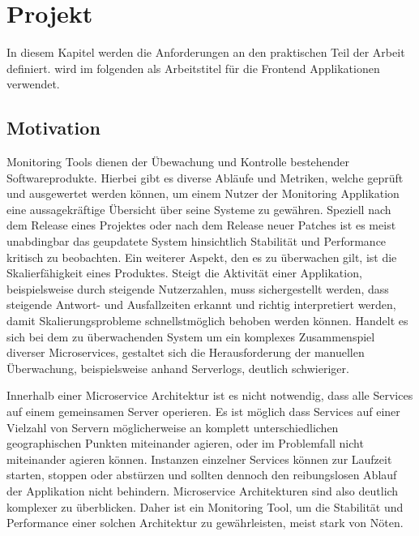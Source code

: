 
\chapter{Projekt \projectname{}}

In diesem Kapitel werden die Anforderungen an den praktischen Teil der Arbeit definiert.
\projectname{} wird im folgenden als Arbeitstitel für die Frontend Applikationen verwendet.

\section{Motivation}

Monitoring Tools dienen der Übewachung und Kontrolle bestehender Softwareprodukte.
Hierbei gibt es diverse Abläufe und Metriken, welche geprüft und ausgewertet werden können, um einem Nutzer der Monitoring Applikation
eine aussagekräftige Übersicht über seine Systeme zu gewähren. Speziell nach dem Release eines Projektes oder nach dem Release neuer Patches
ist es meist unabdingbar das geupdatete System hinsichtlich Stabilität und Performance kritisch zu beobachten. Ein weiterer Aspekt, den es zu überwachen gilt,
ist die Skalierfähigkeit eines Produktes. Steigt die Aktivität einer Applikation, beispielsweise durch steigende Nutzerzahlen,
muss sichergestellt werden, dass steigende Antwort- und Ausfallzeiten erkannt und richtig interpretiert werden, damit Skalierungsprobleme schnellstmöglich behoben werden können.
Handelt es sich bei dem zu überwachenden System um ein komplexes Zusammenspiel diverser Microservices, gestaltet sich die Herausforderung der manuellen Überwachung, beispielsweise anhand
Serverlogs, deutlich schwieriger.

Innerhalb einer Microservice Architektur ist es nicht notwendig, dass alle Services auf einem gemeinsamen Server operieren.
Es ist möglich dass Services auf einer Vielzahl von Servern möglicherweise an komplett unterschiedlichen geographischen Punkten miteinander agieren,
oder im Problemfall nicht miteinander agieren können. Instanzen einzelner Services können zur Laufzeit starten, stoppen oder abstürzen
und sollten dennoch den reibungslosen Ablauf der Applikation nicht behindern. Microservice Architekturen sind also deutlich komplexer zu überblicken.
Daher ist ein Monitoring Tool, um die Stabilität und Performance einer solchen Architektur zu gewährleisten, meist stark von Nöten.

\newpage

